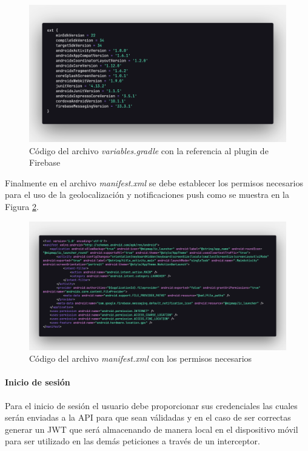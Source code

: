 \begin{figure}[H]
    \centering
    \includegraphics[width=1\textwidth]{resources/images/app-gradle}
    \caption{Código del archivo \textit{variables.gradle} con la referencia al plugin de Firebase}
    \label{fig:app-gradle}
\end{figure}

Finalmente en el archivo \textit{manifest.xml} se debe establecer los permisos necesarios para el uso de la geolocalización y notificaciones push como se muestra en la Figura \ref{fig:app-manifest}.

\begin{figure}[H]
    \centering
    \includegraphics[width=1\textwidth]{resources/images/app-manifest}
    \caption{Código del archivo \textit{manifest.xml} con los permisos necesarios}
    \label{fig:app-manifest}
\end{figure}

\paragraph{Inicio de sesión}

Para el inicio de sesión el usuario debe proporcionar sus credenciales las cuales serán enviadas a la API para que sean válidadas y en el caso de ser correctas generar un JWT que será almacenando de manera local en el dispositivo móvil para ser utilizado en las demás peticiones a través de un interceptor.

